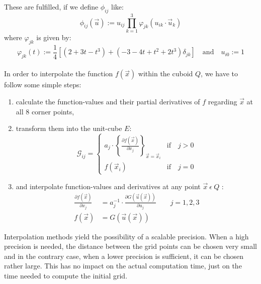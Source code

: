     These are fulfilled, if we define $\phi_{ij}$ like:
    \begin{equation}
	    \phi_{ij}(\vec{u}) := u_{ij} \prod_{k=1}^{3} \varphi_{jk} (u_{ik} \cdot \vec{u}_{k})
    \end{equation}
    where $\varphi_{jk}$ is given by:
    \begin{equation}
	    \varphi_{jk}(t) := \frac{1}{4} \left[ \left( 2+3t-t^{3}\right) + \left( -3-4t+t^{2}+2t^{3}\right) \delta_{jk} \right] \quad \mbox{and} \quad u_{i0}:=1
    \end{equation}
    \\
    In order to interpolate the function $f(\vec{x})$ within the cuboid $Q$, we have to follow some simple steps:
    \begin{enumerate}
	    \item calculate the function-values and their partial derivatives of $f$ regarding $\vec{x}$ at all 8 corner points,
	    \item transform them into the unit-cube $E$:
		    \begin{equation}
		    \mathcal{G}_{ij} =
		    \begin{cases}
			    a_{j} \cdot \left\lbrace \frac{\partial f(\vec{x})}{\partial x_{j}} \right\rbrace_{\vec{x}=\vec{x}_{i}} & \text{if} \quad j>0 \\
			    f(\vec{x}_{i}) & \text{if} \quad j=0
		    \end{cases}
		    \end{equation}
	    \item and interpolate function-values and derivatives at any point $\vec{x} ~ \epsilon ~ Q$ :
		    \begin{equation}
		    \begin{aligned}
			    \frac{\partial f(\vec{x})}{\partial x_{j}} &= a_{j}^{-1} \cdot \frac{\partial G(\vec{u}(\vec{x}))}{\partial u_{j}} \qquad j=1,2,3 \\
			    f(\vec{x}) &= G(\vec{u}(\vec{x}))
		    \end{aligned}
		    \end{equation}
    \end{enumerate}
    Interpolation methods  yield the possibility of a scalable precision. When a high precision is needed, the distance between the grid points can be chosen very small and in the contrary case, when a lower precision is sufficient, it can be chosen rather large. This has no impact on the actual computation time, just on the time needed to compute the initial grid.
